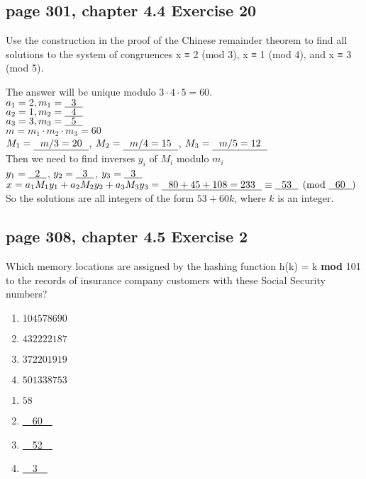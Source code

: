 \documentclass[sigconf]{acmart}
\begin{document}
\subsection{page 301, chapter 4.4 Exercise 20}
\begin{shaded}
    Use the construction in the proof of the Chinese remainder theorem to find all solutions to the system of congruences x ≡ 2 (mod 3), x ≡ 1 (mod 4), and x ≡ 3 (mod 5).
\end{shaded}  
The answer will be unique modulo $3 \cdot 4 \cdot 5 = 60$.\\
$a_1 = 2, m_1 = \uline{~~3~~}$\\ 
$a_2 = 1, m_2 = \uline{~~4~~}$\\ 
$a_3 = 3, m_3 = \uline{~~5~~}$\\ 
$m = m_1 \cdot m_2 \cdot m_3 = 60$ \\
$M_1 = \uline{~~m/3 = 20~~}$, $M_2 = \uline{~~m/4 = 15~~}$, $M_3 = \uline{~~m/5 = 12~~}$\\
Then we need to find inverses $y_i$ of $M_i$ modulo $m_i$\\
$y_1 = \uline{~~2~~}$, $y_2 = \uline{~~3~~}$, $y_3 = \uline{~~3~~}$\\
$ x =  a_1 M_1 y_1 + a_2 M_2 y_2 + a_3 M_3 y_3 = \uline{~~80 + 45 + 108 = 233~~} \equiv \uline{~~53~~} \pmod{\uline{~~60~~}}$\\
So the solutions are all integers of the form $53 + 60k$, where $k$ is an integer.

\subsection{page 308, chapter 4.5 Exercise 2}
\begin{shaded}
    Which memory locations are assigned by the hashing function h(k) = k \textbf{mod} 101 to the records of insurance company customers with these Social Security numbers?
    \begin{enumerate}[label=(\alph*)]
    	\item $104578690$
    	\item $432222187$
    	\item $372201919$
    	\item $501338753$
    \end{enumerate}
\end{shaded} 
\begin{enumerate}[label=(\alph*)]
	\item $58$
	\item \uline{~~60~~}
	\item \uline{~~52~~}
	\item \uline{~~3~~}
\end{enumerate}
\end{document}
